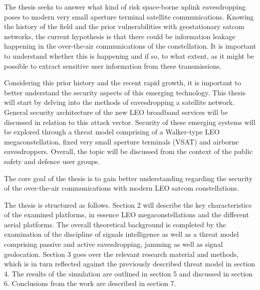 \documentclass[english, 12pt, a4paper, elec, utf8, a-1b, online]{aaltothesis}
\begin{document}




The thesis seeks to answer what kind of risk space-borne uplink eavesdropping poses to modern very small aperture terminal satellite communications. Knowing the history of the field and the prior vulnerabilities with geostationary satcom networks, the current hypothesis is that there could be information leakage happening in the over-the-air communications of the constellation. It is important to understand whether this is happening and if so, to what extent, as it might be possible to extract sensitive user information from these transmissions.

Considering this prior history and the recent rapid growth, it is important to better understand the security aspects of this emerging technology. This thesis will start by delving into the methods of eavesdropping a satellite network. General security architecture of the new LEO broadband services will be discussed in relation to this attack vector. Security of these emerging systems will be explored through a threat model comprising of a Walker-type LEO megaconstellation, fixed very small aperture terminals (VSAT) and airborne eavesdroppers. Overall, the topic will be discussed from the context of the public safety and defence user groups.




The core goal of the thesis is to gain better understanding regarding the security of the over-the-air communications with modern LEO satcom constellations. 


The thesis is structured as follows. Section 2 will describe the key characteristics of the examined platforms, in essence LEO megaconstellations and the different aerial platforms. The overall theoretical background is completed by the examination of the discipline of signals intelligence as well as a threat model comprising passive and active eavesdropping, jamming as well as signal geolocation. Section 3 goes over the relevant research material and methods, which is in turn reflected against the previously described threat model in section 4. The results of the simulation are outlined in section 5 and discussed in section 6. Conclusions from the work are described in section 7.
\end{document}
